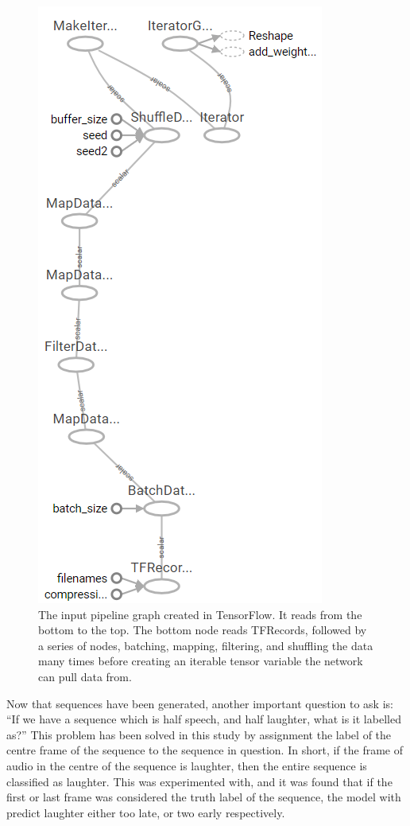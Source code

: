 \documentclass[a4paper,11pt,notitlepage]{article}
\begin{document}
\begin{figure}[H]
	\centering
	\vspace{0.5cm}
	\includegraphics[scale = 0.75]{figs/input_pipeline_graph.png}
	\caption{The input pipeline graph created in TensorFlow. It reads from the bottom to the top. The bottom node reads TFRecords, followed by a series of nodes, batching, mapping, filtering, and shuffling the data many times before creating an iterable tensor variable the network can pull data from.}
	\label{input_pipeline_graph}
\end{figure}

\noindent
Now that sequences have been generated, another important question to ask is: ``If we have a sequence which is half speech, and half laughter, what is it labelled as?'' This problem has been solved in this study by assignment the label of the centre frame of the sequence to the sequence in question. In short, if the frame of audio in the centre of the sequence is laughter, then the entire sequence is classified as laughter. This was experimented with, and it was found that if the first or last frame was considered the truth label of the sequence, the model with predict laughter either too late, or two early respectively.
\end{document}
